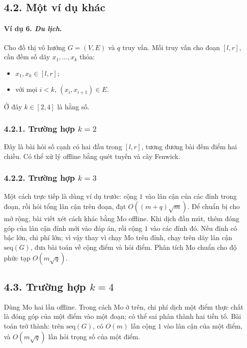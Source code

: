 \documentclass[11pt]{article}
\begin{document}
\subsection*{4.2. Một ví dụ khác}

\paragraph{Ví dụ 6. \emph{Du lịch}.}
Cho đồ thị vô hướng \(G=(V,E)\) và \(q\) truy vấn. Mỗi truy vấn cho đoạn
\([l,r]\), cần đếm số dãy \(x_1,\ldots,x_k\) thỏa:
\begin{itemize}
  \item \(x_1,x_k\in[l,r]\);
  \item với mọi \(i<k\), \((x_i,x_{i+1})\in E\).
\end{itemize}
Ở đây \(k\in[2,4]\) là hằng số.

\subsubsection*{4.2.1. Trường hợp \(k=2\)}

Đây là bài hỏi số cạnh có hai đầu trong \([l,r]\), tương đương bài đếm điểm
hai chiều. Có thể xử lý offline bằng quét tuyến và cây Fenwick.

\subsubsection*{4.2.2. Trường hợp \(k=3\)}

Một cách trực tiếp là dùng ví dụ trước: cộng \(1\) vào lân cận của các đỉnh
trong đoạn, rồi hỏi tổng lân cận trên đoạn, đạt \(O((m+q)\sqrt m)\). Để chuẩn
bị cho mở rộng, bài viết xét cách khác bằng Mo offline. Khi dịch đầu mút, thêm
đóng góp của lân cận đỉnh mới vào đáp án, rồi cộng \(1\) vào các đỉnh đó. Nếu
đỉnh có bậc lớn, chi phí lớn; vì vậy thay vì chạy Mo trên đỉnh, chạy trên dãy
lân cận \(\mathrm{seq}(G)\), đưa bài toán về cộng điểm và hỏi điểm. Phân tích
Mo chuẩn cho độ phức tạp \(O(m\sqrt q)\).

\subsection*{4.3. Trường hợp \(k=4\)}

Dùng Mo hai lần offline. Trong cách Mo ở trên, chi phí dịch một điểm thực chất
là đóng góp của một điểm vào một đoạn; có thể sai phân thành hai tiền tố. Bài
toán trở thành: trên \(\mathrm{seq}(G)\), có \(O(m)\) lần cộng \(1\) vào lân
cận của một điểm, và \(O(m\sqrt q)\) lần hỏi trọng số của một điểm.
\end{document}
